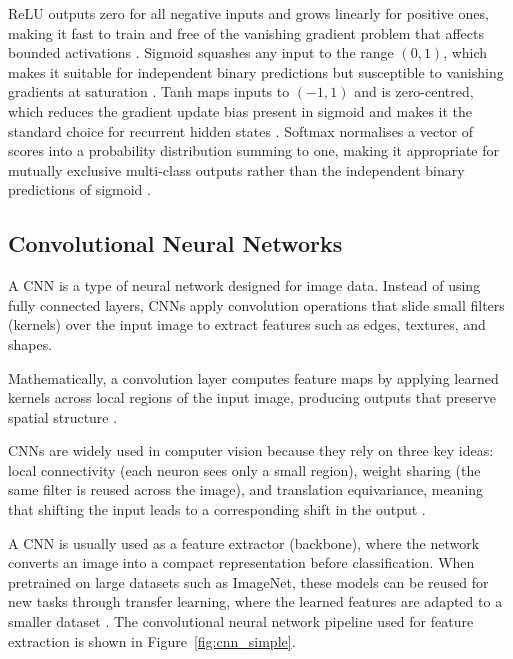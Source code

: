ReLU outputs zero for all negative inputs and grows linearly for positive 
ones, making it fast to train and free of the vanishing gradient problem 
that affects bounded activations \cite{siswantoro_facial_2024}. Sigmoid 
squashes any input to the range $(0, 1)$, which makes it suitable for 
independent binary predictions but susceptible to vanishing gradients at 
saturation \cite{siswantoro_facial_2024}. Tanh maps inputs to $(-1, 1)$ 
and is zero-centred, which reduces the gradient update bias present in 
sigmoid and makes it the standard choice for recurrent hidden states 
\cite{siswantoro_facial_2024}. Softmax normalises a vector of scores into 
a probability distribution summing to one, making it appropriate for 
mutually exclusive multi-class outputs rather than the independent binary 
predictions of sigmoid \cite{siswantoro_facial_2024}.

\subsection{Convolutional Neural Networks}\label{sec:bg:cnn}


A \ac{CNN} is a type of neural network designed for image data. Instead of using fully connected layers, \ac{CNN}s apply convolution operations that slide small filters (kernels) over the input image to extract features such as edges, textures, and shapes.

Mathematically, a convolution layer computes feature maps by applying learned kernels across local regions of the input image, producing outputs that preserve spatial structure \cite{aly_revolutionizing_2025}.

\ac{CNN}s are widely used in computer vision because they rely on three key ideas: local connectivity (each neuron sees only a small region), weight sharing (the same filter is reused across the image), and translation equivariance, meaning that shifting the input leads to a corresponding shift in the output \cite{aly_revolutionizing_2025,gupta_edfa_2023}.

A \ac{CNN} is usually used as a feature extractor (backbone), where the network converts an image into a compact representation before classification. When pretrained on large datasets such as ImageNet, these models can be reused for new tasks through transfer learning, where the learned features are adapted to a smaller dataset \cite{komaravalli_detecting_2023,aly_revolutionizing_2025}.
The convolutional neural network pipeline used for feature extraction is shown in Figure~\ref{fig:cnn_simple}.

